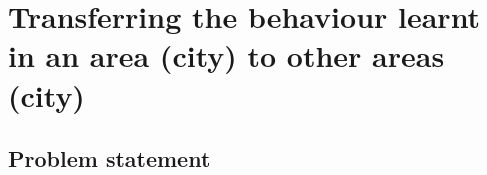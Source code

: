 \chapter{Transferring the behaviour learnt in an area (city) to other areas (city)}
\label{cha:transfer learning}
\ifpdf
    \graphicspath{{Chapter6/Figs/Raster/}{Chapter6/Figs/PDF/}{Chapter6/Figs/}}
\else
    \graphicspath{{Chapter6/Figs/Vector/}{Chapter6/Figs/}}
\fi

\section{Problem statement}

